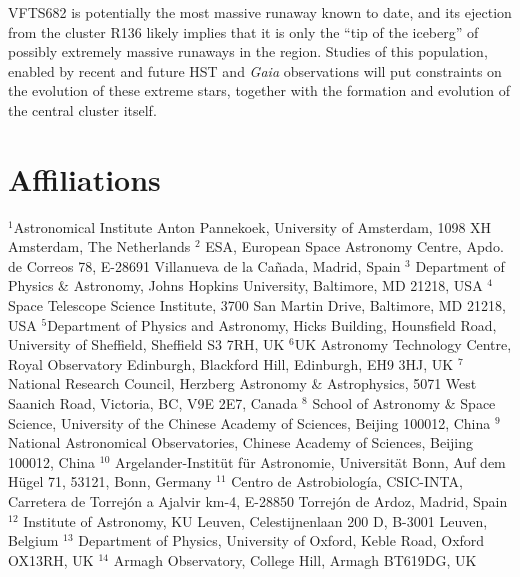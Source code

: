 \documentclass[a4paper,fleqn,usenatbib]{mnras}
\begin{document}
VFTS682 is potentially the most massive runaway known to date, and its ejection
from the cluster R136 likely implies that it is only the ``tip of the
iceberg'' of possibly extremely massive runaways in the
region. Studies of this population, enabled by recent and future HST and \emph{Gaia} observations will put constraints on the evolution
of these extreme stars, together with the formation and evolution of
the central cluster itself.
\vspace*{-20pt}




\label{lastpage}

\vspace*{-20pt}
\section*{Affiliations}
 \tiny
\noindent $^{1}${Astronomical Institute Anton Pannekoek, University of
    Amsterdam, 1098 XH Amsterdam, The Netherlands} 
  $^{2}$ {ESA, European Space Astronomy Centre, Apdo. de Correos 78,
    E-28691 Villanueva de la Ca\~nada, Madrid, Spain} 
 $^{3}$ {
 Department of Physics \& Astronomy, Johns Hopkins University, Baltimore, MD 21218, USA}
  $^{4}$ {Space Telescope Science Institute, 3700 San Martin Drive,
    Baltimore, MD 21218, USA}
  $^{5}${Department of Physics and Astronomy, Hicks Building,
    Hounsfield Road, University of Sheffield, Sheffield S3 7RH, UK}
  $^{6}${UK Astronomy Technology Centre, Royal Observatory Edinburgh, Blackford Hill, Edinburgh, EH9 3HJ, UK}
  $^{7}$ {National Research Council, Herzberg Astronomy \&
    Astrophysics, 5071 West Saanich Road, Victoria, BC, V9E 2E7,
    Canada}
  $^{8}$ {School of Astronomy \& Space Science, University of the Chinese
    Academy of Sciences, Beijing 100012, China}
  $^{9}$ {National Astronomical Observatories, Chinese Academy of
    Sciences, Beijing 100012, China}
  $^{10}$ {Argelander-Instit\"ut f\"ur Astronomie, Universit\"at Bonn,
    Auf dem H\"ugel 71, 53121, Bonn, Germany}
  $^{11}$ {Centro de Astrobiolog\'ia, CSIC-INTA, Carretera de Torrej\'on a Ajalvir km-4, E-28850 Torrej\'on de Ardoz, Madrid, Spain}
  $^{12}$ {Institute of Astronomy, KU Leuven, Celestijnenlaan 200 D, B-3001 Leuven, Belgium}
  $^{13}$ {Department of Physics, University of Oxford, Keble Road,
    Oxford OX13RH, UK} 
  $^{14}$ {Armagh Observatory, College Hill, Armagh BT619DG, UK}\\
\end{document}
